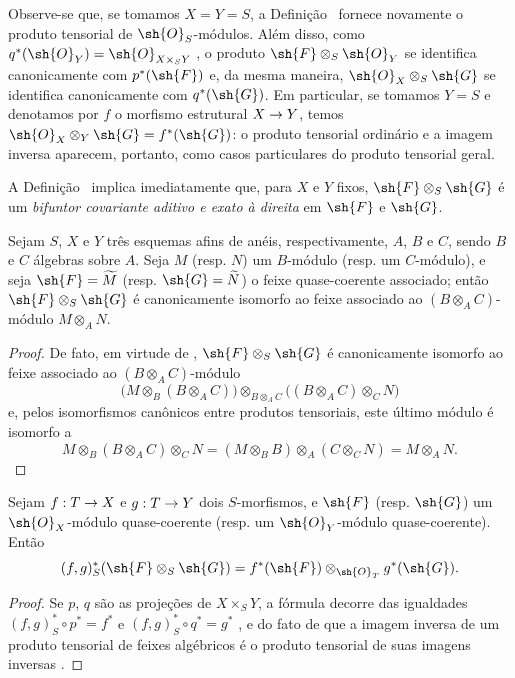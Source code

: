 \documentclass[oneside]{amsart}
\makeatletter
\newcommand{\ega@arrow}[2]{\mathchoice{#1}{#2}{#2}{#2}}
\renewcommand{\to}{\ega@arrow{\longrightarrow}{\rightarrow}}
\newcommand{\oldpage}[2][]{{\marginnote{\normalfont\textbf{#1}~|~#2}}\ignorespaces}
\let\EGAOriginalLabel\label
\renewcommand{\label}[1]{\phantomsection\EGAOriginalLabel{#1}}
\makeatother
\begin{document}
Observe-se que, se tomamos $X=Y=S$, a Definição~ fornece novamente o produto
tensorial de $\sh{O}_S$-módulos. Além disso, como $q^*(\sh{O}_Y)=\sh{O}_{X\times_S Y}$
, o produto $\sh{F}\otimes_S\sh{O}_Y$ se identifica
canonicamente com $p^*(\sh{F})$ e, da mesma maneira,
$\sh{O}_X\otimes_S\sh{G}$ se identifica canonicamente com $q^*(\sh{G})$. Em
particular, se tomamos $Y=S$ e denotamos por $f$ o morfismo estrutural $X\to Y$,
temos $\sh{O}_X\otimes_Y\sh{G}=f^*(\sh{G})$: o produto tensorial ordinário
e a imagem inversa aparecem, portanto, como casos particulares do produto
tensorial geral.

A Definição~ implica imediatamente que, para $X$ e
$Y$ fixos, $\sh{F}\otimes_S\sh{G}$ é um \emph{bifuntor covariante aditivo e exato à direita} em $\sh{F}$ e $\sh{G}$.

\begin{proposition}[9.1.3]
\label{I.9.1.3}
Sejam $S$, $X$ e $Y$ três esquemas afins de anéis,
respectivamente, $A$, $B$ e $C$, sendo $B$ e $C$ álgebras sobre $A$. Seja $M$
(resp. $N$) um $B$-módulo (resp. um $C$-módulo), e seja
$\sh{F}=\widetilde{M}$ (resp. $\sh{G}=\widetilde{N}$) o
feixe quase-coerente associado; então $\sh{F}\otimes_S\sh{G}$ é
canonicamente isomorfo ao feixe associado ao $(B\otimes_A C)$-módulo
$M\otimes_A N$.
\end{proposition}

\begin{proof}
\oldpage[I]{170}
De fato, em virtude de , $\sh{F}\otimes_S\sh{G}$
é canonicamente isomorfo ao feixe associado ao $(B\otimes_A C)$-módulo
\[
  \big(M\otimes_B(B\otimes_A C)\big)\otimes_{B\otimes_A C}\big((B\otimes_A C)\otimes_C N\big)
\]
e, pelos isomorfismos canônicos entre produtos tensoriais, este último módulo é isomorfo a
\[
  M\otimes_B(B\otimes_A C)\otimes_C N=(M\otimes_B B)\otimes_A(C\otimes_C N)=M\otimes_A N.
\]
\end{proof}

\begin{proposition}[9.1.4]
\label{I.9.1.4}
Sejam $f:T\to X$ e $g:T\to Y$ dois $S$-morfismos, e $\sh{F}$ (resp. $\sh{G}$) um $\sh{O}_X$-módulo quase-coerente (resp. um $\sh{O}_Y$-módulo quase-coerente).
Então
\[
  (f,g)^*_S(\sh{F}\otimes_S\sh{G})=f^*(\sh{F})\otimes_{\sh{O}_T}g^*(\sh{G}).
\]
\end{proposition}

\begin{proof}
Se $p$, $q$ são as projeções de $X\times_S Y$, a fórmula decorre
das igualdades $(f,g)^*_S\circ p^*=f^*$ e
$(f,g)^*_S\circ q^*=g^*$ , e do fato de que a imagem
inversa de um produto tensorial de feixes algébricos é o produto tensorial de suas imagens
inversas .
\end{proof}
\end{document}

